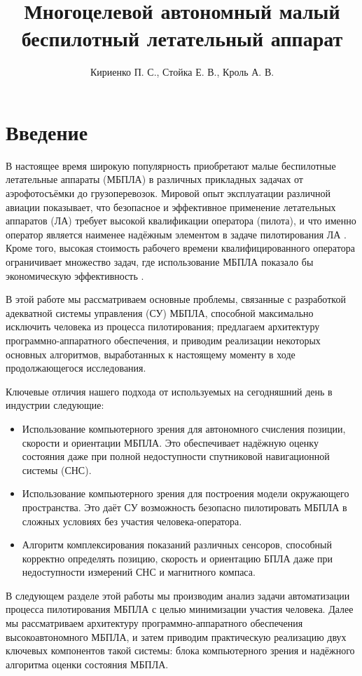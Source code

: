 \documentclass[11pt,a4paper]{article}
\title{Многоцелевой автономный малый беспилотный летательный аппарат}
\author{Кириенко П. С., Стойка Е. В., Кроль А. В.}
\affil{Zubax Robotics, г. Москва}
\date{}
\begin{document}
\maketitle

\section{Введение}

В настоящее время широкую популярность приобретают малые беспилотные летательные аппараты (МБПЛА) в различных прикладных задачах от аэрофотосъёмки до грузоперевозок. Мировой опыт эксплуатации различной авиации показывает, что безопасное и эффективное применение летательных аппаратов (ЛА) требует высокой квалификации оператора (пилота), и что именно оператор является наименее надёжным элементом в задаче пилотирования ЛА \cite{RiskManagementHandbookFAA, PlaneCrashInfo, HumanFactorsBoeing}. Кроме того, высокая стоимость рабочего времени квалифицированного оператора ограничивает множество задач, где использование МБПЛА показало бы экономическую эффективность \cite{DroneHire}.

В этой работе мы рассматриваем основные проблемы, связанные с разработкой адекватной системы управления (СУ) МБПЛА, способной максимально исключить человека из процесса пилотирования; предлагаем архитектуру программно-аппаратного обеспечения, и приводим реализации некоторых основных алгоритмов, выработанных к настоящему моменту в ходе продолжающегося исследования.

Ключевые отличия нашего подхода от используемых на сегодняшний день в индустрии следующие:

\begin{itemize}
    \item Использование компьютерного зрения для автономного счисления позиции, скорости и ориентации МБПЛА. Это обеспечивает надёжную оценку состояния даже при полной недоступности спутниковой навигационной системы (СНС).
    \item Использование компьютерного зрения для построения модели окружающего пространства. Это даёт СУ возможность безопасно пилотировать МБПЛА в сложных условиях без участия человека-оператора.
    \item Алгоритм комплексирования показаний различных сенсоров, способный корректно определять позицию, скорость и ориентацию БПЛА даже при недоступности измерений СНС и магнитного компаса.
\end{itemize}

В следующем разделе этой работы мы производим анализ задачи автоматизации процесса пилотирования МБПЛА с целью минимизации участия человека. Далее мы рассматриваем архитектуру программно-аппаратного обеспечения высокоавтономного МБПЛА, и затем приводим практическую реализацию двух ключевых компонентов такой системы: блока компьютерного зрения и надёжного алгоритма оценки состояния МБПЛА.
\end{document}
